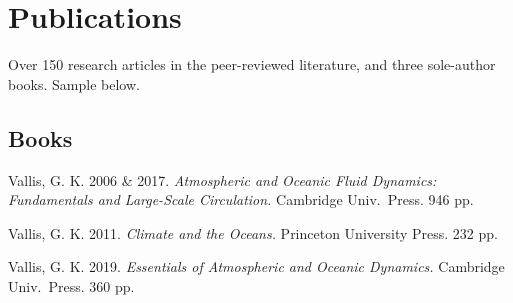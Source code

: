 \documentclass[11pt]{article}
\begin{document}


\section*{Publications}

Over 150 research articles in the peer-reviewed literature, and three sole-author books. Sample below.  


\subsection*{Books}
\begin{mediumdesc}[leftmargin=2mm]%

\item[] Vallis, G. K. 2006 \& 2017. \textit{Atmospheric and Oceanic Fluid Dynamics:
	Fundamentals and Large-Scale Circulation.} Cambridge Univ.\ Press. 946 pp.  

\item Vallis, G. K. 2011. \textit{Climate and the Oceans.} Princeton University Press. 232 pp.
        
\item Vallis, G. K. 2019. \textit{Essentials of Atmospheric and Oceanic Dynamics.}  Cambridge Univ.\ Press. 360 pp.  %
	
\end{mediumdesc}

\newcommand{\doi}{doi:~}
\renewcommand{\refname}{}  %
\end{document}
